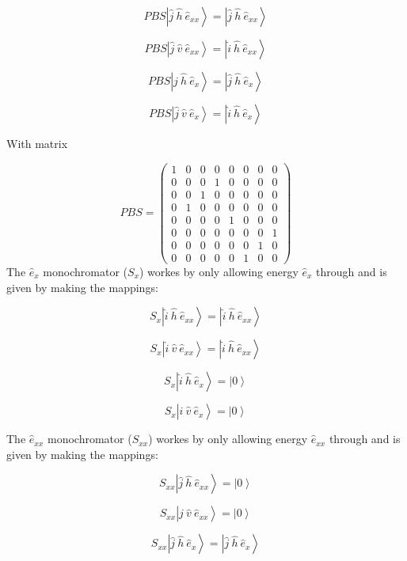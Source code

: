 \documentclass[12pt, twoside]{article}
\numberwithin{equation}{section}
\begin{document}
\[ PBS \left| \hat{j} \ \hat{h} \ \hat{e}_{xx} \right\rangle = \left| \hat{j} \ \hat{h} \ \hat{e}_{xx} \right\rangle\]

\[ PBS \left| \hat{j} \ \hat{v} \ \hat{e}_{xx} \right\rangle = \left| \hat{i} \ \hat{h} \ \hat{e}_{xx} \right\rangle\]

\[ PBS \left| \hat{j} \ \hat{h} \ \hat{e}_{x} \right\rangle = \left| \hat{j} \ \hat{h} \ \hat{e}_{x} \right\rangle\]

\[ PBS \left| \hat{j} \ \hat{v} \ \hat{e}_{x} \right\rangle = \left| \hat{i} \ \hat{h} \ \hat{e}_{x} \right\rangle\]

With matrix

\[PBS = \begin{pmatrix} 1& 0& 0& 0& 0& 0& 0& 0\\0& 0& 0& 1& 0& 0& 0& 0\\0& 0& 1& 0& 0& 0& 0& 0\\0& 1& 0& 0& 0& 0& 0& 0\\0& 0& 0& 0& 1& 0& 0& 0\\0& 0& 0& 0& 0& 0& 0& 1\\0& 0& 0& 0& 0& 0& 1& 0\\0& 0& 0& 0& 0& 1& 0& 0 \end{pmatrix}\]
The $\hat{e}_x$ monochromator ($S_x$) workes by only allowing energy
$\hat{e}_x$ through and is given by making the mappings:

\[ S_x \left| \hat{i} \ \hat{h} \ \hat{e}_{xx} \right\rangle = \left| \hat{i} \ \hat{h} \ \hat{e}_{xx}  \right\rangle\]

\[ S_x \left| \hat{i} \ \hat{v} \ \hat{e}_{xx} \right\rangle = \left| \hat{i} \ \hat{h} \ \hat{e}_{xx}  \right\rangle\]

\[ S_x \left| \hat{i} \ \hat{h} \ \hat{e}_{x} \right\rangle = \left| 0  \right\rangle\]

\[ S_x \left| \hat{i} \ \hat{v} \ \hat{e}_{x} \right\rangle = \left| 0  \right\rangle\]

The $\hat{e}_{xx}$ monochromator ($S_{xx}$) workes by only allowing
energy $\hat{e}_{xx}$ through and is given by making the mappings:

\[ S_{xx} \left| \hat{j} \ \hat{h} \ \hat{e}_{xx} \right\rangle = \left| 0 \right\rangle\]

\[ S_{xx} \left| \hat{j} \ \hat{v} \ \hat{e}_{xx} \right\rangle = \left| 0 \right\rangle\]

\[ S_{xx} \left| \hat{j} \ \hat{h} \ \hat{e}_{x} \right\rangle = \left| \hat{j} \ \hat{h} \ \hat{e}_{x} \right\rangle\]
\end{document}
